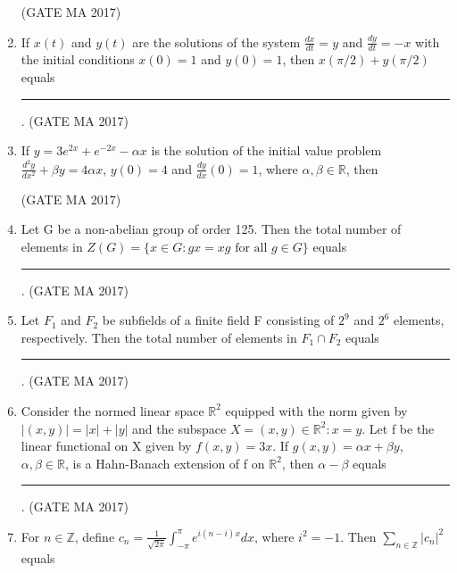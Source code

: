 \documentclass[journal,12pt,onecolumn]{IEEEtran}
\theoremstyle{remark}
\begin{document}
\begin{enumerate}
\begin{enumerate}
\end{enumerate}
\hfill (GATE MA 2017)
\item
If $x(t)$ and $y(t)$ are the solutions of the system $\frac{dx}{dt} = y$ and $\frac{dy}{dt} = -x$ with the initial conditions $x(0)=1$ and $y(0)=1$, then $x(\pi/2) + y(\pi/2)$ equals \rule{1.5cm}{0.4pt}.
\hfill (GATE MA 2017)
\item
If $y = 3e^{2x} + e^{-2x} - \alpha x$ is the solution of the initial value problem $\frac{d^2y}{dx^2} + \beta y = 4\alpha x$, $y(0)=4$ and $\frac{dy}{dx}(0)=1$, where $\alpha, \beta \in \mathbb{R}$, then
\begin{enumerate}
\end{enumerate}
\hfill (GATE MA 2017)
\item
Let G be a non-abelian group of order 125. Then the total number of elements in $Z(G) = \{x \in G : gx=xg \text{ for all } g \in G\}$ equals \rule{1.5cm}{0.4pt}.
\hfill (GATE MA 2017)
\item
Let $F_1$ and $F_2$ be subfields of a finite field F consisting of $2^9$ and $2^6$ elements, respectively. Then the total number of elements in $F_1 \cap F_2$ equals \rule{1.5cm}{0.4pt}.
\hfill (GATE MA 2017)
\item
Consider the normed linear space $\mathbb{R}^2$ equipped with the norm given by $|(x,y)| = |x|+|y|$ and the subspace $X = {(x,y) \in \mathbb{R}^2 : x=y}$. Let f be the linear functional on X given by $f(x,y)=3x$. If $g(x,y)=\alpha x + \beta y$, $\alpha, \beta \in \mathbb{R}$, is a Hahn-Banach extension of f on $\mathbb{R}^2$, then $\alpha - \beta$ equals \\ \rule{1.5cm}{0.4pt}.
\hfill (GATE MA 2017)
\item
For $n \in \mathbb{Z}$, define $c_n = \frac{1}{\sqrt{2\pi}} \int_{-\pi}^{\pi} e^{i(n-i)x} dx$, where $i^2 = -1$. Then $\sum_{n \in \mathbb{Z}} |c_n|^2$ equals

\end{enumerate}
\end{document}
